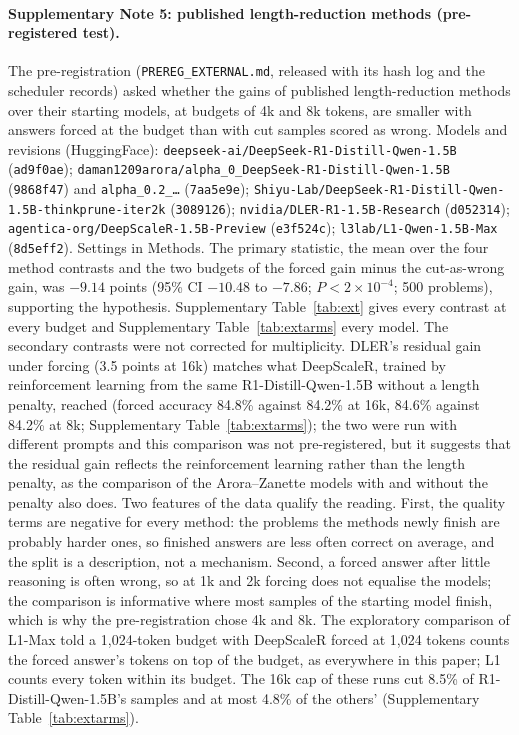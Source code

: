 \documentclass[10pt]{article}
\begin{document}
\begin{sloppypar}
\paragraph{Supplementary Note 5: published length-reduction methods (pre-registered test).} The pre-registration (\texttt{PREREG\_EXTERNAL.md}, released with its hash log and the scheduler records) asked whether the gains of published length-reduction methods over their starting models, at budgets of 4k and 8k tokens, are smaller with answers forced at the budget than with cut samples scored as wrong. Models and revisions (HuggingFace): \texttt{deepseek-ai/DeepSeek-R1-Distill-Qwen-1.5B} (\texttt{ad9f0ae}); \texttt{daman1209arora/alpha\_0\_DeepSeek-R1-Distill-Qwen-1.5B} (\texttt{9868f47}) and \texttt{alpha\_0.2\_\ldots} (\texttt{7aa5e9e})\cite{arora2025training}; \texttt{Shiyu-Lab/DeepSeek-R1-Distill-Qwen-1.5B-thinkprune-iter2k} (\texttt{3089126})\cite{hou2025thinkprune}; \texttt{nvidia/DLER-R1-1.5B-Research} (\texttt{d052314})\cite{liu2025dler}; \texttt{agentica-org/DeepScaleR-1.5B-Preview} (\texttt{e3f524c}); \texttt{l3lab/L1-Qwen-1.5B-Max} (\texttt{8d5eff2})\cite{aggarwal2025l1}. Settings in Methods. The primary statistic, the mean over the four method contrasts and the two budgets of the forced gain minus the cut-as-wrong gain, was $-9.14$ points (95\% CI $-10.48$ to $-7.86$; $P<2\times10^{-4}$; 500 problems), supporting the hypothesis. Supplementary Table~\ref{tab:ext} gives every contrast at every budget and Supplementary Table~\ref{tab:extarms} every model. The secondary contrasts were not corrected for multiplicity. DLER's residual gain under forcing (3.5 points at 16k) matches what DeepScaleR, trained by reinforcement learning from the same R1-Distill-Qwen-1.5B without a length penalty, reached (forced accuracy 84.8\% against 84.2\% at 16k, 84.6\% against 84.2\% at 8k; Supplementary Table~\ref{tab:extarms}); the two were run with different prompts and this comparison was not pre-registered, but it suggests that the residual gain reflects the reinforcement learning rather than the length penalty, as the comparison of the Arora--Zanette models with and without the penalty also does. Two features of the data qualify the reading. First, the quality terms are negative for every method: the problems the methods newly finish are probably harder ones, so finished answers are less often correct on average, and the split is a description, not a mechanism. Second, a forced answer after little reasoning is often wrong, so at 1k and 2k forcing does not equalise the models; the comparison is informative where most samples of the starting model finish, which is why the pre-registration chose 4k and 8k. The exploratory comparison of L1-Max told a 1{,}024-token budget with DeepScaleR forced at 1{,}024 tokens counts the forced answer's tokens on top of the budget, as everywhere in this paper; L1 counts every token within its budget. The 16k cap of these runs cut 8.5\% of R1-Distill-Qwen-1.5B's samples and at most 4.8\% of the others' (Supplementary Table~\ref{tab:extarms}).
\end{sloppypar}
\end{document}
